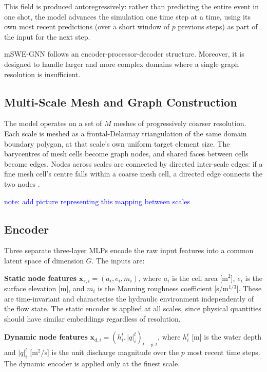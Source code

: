 \documentclass[12pt,a4paper]{report}
\begin{document}
This field is produced autoregressively: rather than predicting the entire event in
one shot, the model advances the simulation one time step at a time, using its own
most recent predictions (over a short window of $p$ previous steps) as part of the
input for the next step.
 
mSWE-GNN \citep{bentivoglio2025mswegnn} follows an encoder-processor-decoder structure.
Moreover, it is designed to handle larger and more complex domains where a single
graph resolution is insufficient.
 
\subsection{Multi-Scale Mesh and Graph Construction}
\label{subsec:multiscale_mesh}

The model operates on a set of $M$ meshes of progressively coarser resolution. Each
scale is meshed as a frontal-Delaunay triangulation of the same
domain boundary polygon, at that scale's own uniform target element size. The barycentres of mesh cells become graph nodes,
and shared faces between cells become edges. Nodes across scales are connected by
directed inter-scale edges: if a fine mesh cell's centre falls within a coarse mesh
cell, a directed edge connects the two nodes \citep{bentivoglio2025mswegnn}.
 
\textcolor{blue}{note: add picture representing this mapping between scales 
}
 
\subsection{Encoder}
\label{subsec:encoder}
 
Three separate three-layer MLPs encode the raw input features into a common latent
space of dimension $G$. The inputs are:
 
\textbf{Static node features} $\mathbf{x}_{s,i} = (a_i, e_i, m_i)$, where $a_i$ is the cell
area [m$^2$], $e_i$ is the surface elevation [m], and $m_i$ is the Manning roughness
coefficient [s/m$^{1/3}$]. These are time-invariant and characterise the hydraulic
environment independently of the flow state. The static encoder is applied at all
scales, since physical quantities should have similar embeddings regardless of
resolution.
 
\textbf{Dynamic node features} $\mathbf{x}_{d,i} = (h_i^t, |q|_i^t)_{t-p:t}$, where $h_i^t$
[m] is the water depth and $|q|_i^t$ [m$^2$/s] is the unit discharge magnitude over
the $p$ most recent time steps. The dynamic encoder is applied only at the finest scale.
 
\end{document}
